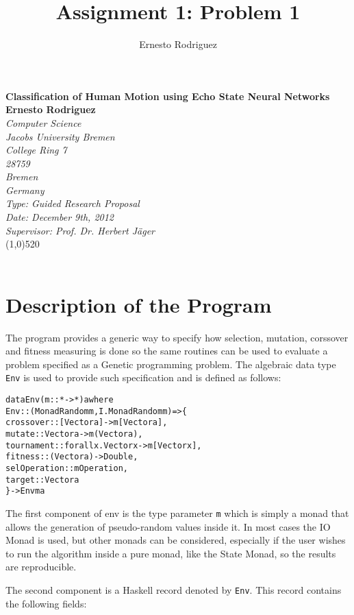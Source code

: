 \documentclass[10pt]{article}
\title{Assignment 1: Problem 1}
\author{Ernesto Rodriguez}
\begin{document}
\Huge{\bf Classification of Human Motion using Echo State Neural Networks\\[1cm]}
\large{\bf Ernesto Rodriguez\\[0.5cm]}
\emph{Computer Science \\ Jacobs University Bremen \\ College Ring 7 \\ 28759 \\ Bremen \\ Germany\\[0.5cm]}
\emph{Type: Guided Research Proposal \\ Date: December 9th, 2012 \\ Supervisor: Prof. Dr. Herbert J\"{a}ger\\}
\line(1,0){520}\\ \\

\section{Description of the Program}

The program provides a generic way to specify how selection, mutation, corssover and fitness measuring is done so the same routines can be used to evaluate a problem specified as a Genetic programming problem. The algebraic data type \verb+Env+ is used to provide such specification and is defined as follows:

\begin{alltt}

data Env (m :: * -> *) a where
  Env :: (MonadRandom m, I.MonadRandom m) => \{
    crossover :: [Vector a] -> m [Vector a],
    mutate :: Vector a -> m (Vector a),
    tournament :: forall x . Vector x -> m [Vector x],
    fitness :: (Vector a) -> Double,
    selOperation :: m Operation,
    target :: Vector a                 
  \} -> Env m a

\end{alltt}

The first component of env is the type parameter \verb+m+ which is simply a monad that allows the generation of pseudo-random values inside it. In most cases the IO Monad is used, but other monads can be considered, especially if the user wishes to run the algorithm inside a pure monad, like the State Monad, so the results are reproducible. 

The second component is a Haskell record denoted by \verb+Env+. This record contains the following fields:
\end{document}
